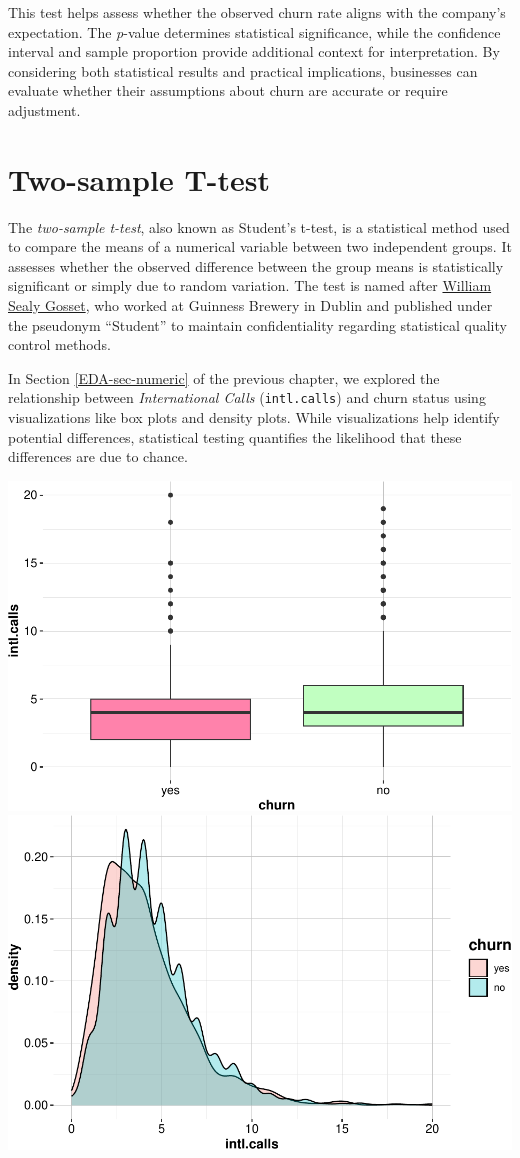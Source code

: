 \documentclass[
]{book}
\newcommand{\passthrough}[1]{#1}
\theoremstyle{definition}
\theoremstyle{definition}
\theoremstyle{definition}
\theoremstyle{definition}
\theoremstyle{remark}
\begin{document}
This test helps assess whether the observed churn rate aligns with the company's expectation. The \emph{p}-value determines statistical significance, while the confidence interval and sample proportion provide additional context for interpretation. By considering both statistical results and practical implications, businesses can evaluate whether their assumptions about churn are accurate or require adjustment.

\section{Two-sample T-test}\label{two-sample-t-test}

The \emph{two-sample t-test}, also known as Student's t-test, is a statistical method used to compare the means of a numerical variable between two independent groups. It assesses whether the observed difference between the group means is statistically significant or simply due to random variation. The test is named after \href{https://en.wikipedia.org/wiki/William_Sealy_Gosset}{William Sealy Gosset}, who worked at Guinness Brewery in Dublin and published under the pseudonym ``Student'' to maintain confidentiality regarding statistical quality control methods.

In Section \ref{EDA-sec-numeric} of the previous chapter, we explored the relationship between \emph{International Calls} (\passthrough{\lstinline!intl.calls!}) and churn status using visualizations like box plots and density plots. While visualizations help identify potential differences, statistical testing quantifies the likelihood that these differences are due to chance.

\includegraphics[width=0.5\linewidth]{statistics_files/figure-latex/unnamed-chunk-9-1} \includegraphics[width=0.5\linewidth]{statistics_files/figure-latex/unnamed-chunk-9-2}
\end{document}
